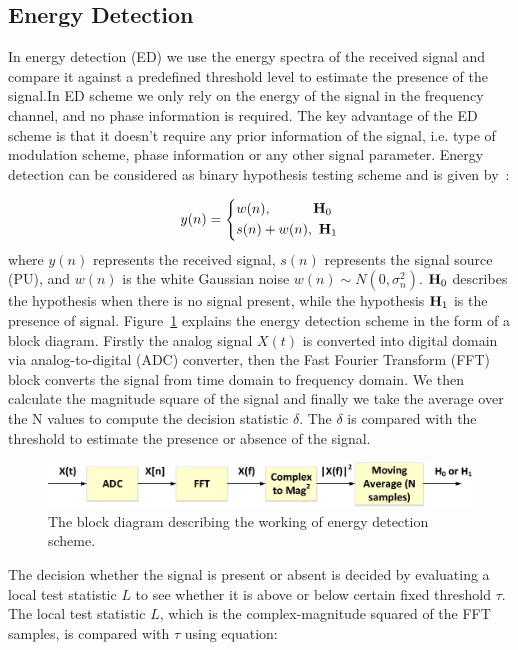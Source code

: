 \subsection{Energy Detection}
In energy detection (ED) we use the energy spectra of the received signal and compare it against a predefined threshold level to estimate the presence of the signal.In ED scheme we only rely on the energy of the signal in the frequency channel, and no phase information is required. The key advantage of the ED scheme is that it doesn't require any prior information of the signal, i.e. type of modulation scheme, phase information or any other signal parameter. Energy detection can be considered as binary hypothesis testing scheme and is given by~\cite{arhtn4}:

\begin{equation}
	\label{eq:1}
     y(n) = 
     \left\{
     \begin{aligned}
   &w(n),~~~~~~~~~\mathbf{H}_0\\
   &s(n) + w(n),~\mathbf{H}_1
    \end{aligned}
    \right.
\end{equation}
where $y(n)$ represents the received signal, $s(n)$ represents the signal source (PU), and $w(n)$ is the white Gaussian noise $w(n) \sim N(0,\sigma_n^2) $. $\mathbf{H}_0$ describes the hypothesis when there is no signal present, while the hypothesis $\mathbf{H}_1$ is the presence of signal. Figure~\ref{energydet} explains the energy detection scheme in the form of a block diagram. Firstly the analog signal $X(t)$ is converted into digital domain via analog-to-digital (ADC) converter, then the Fast Fourier Transform (FFT) block converts the signal from time domain to frequency domain. We then calculate the magnitude square of the signal and finally we take the average over the N values to compute the decision statistic $\delta $. The $\delta$ is compared with the threshold to estimate the presence or absence of the signal.

\begin{figure}[ht!]
	\centering
	\includegraphics[width=\textwidth,keepaspectratio]{images/Gill/figs/energydet.eps}
    \caption{The block diagram describing the working of energy detection scheme.} 
\label{energydet}      
\end{figure}


The decision whether the signal is present or absent is decided by evaluating a local test statistic $L$ to see whether it is above or below certain fixed threshold $\tau$. 
The local test statistic $L$, which is the complex-magnitude squared of the FFT samples, is compared with $\tau$ using equation:

